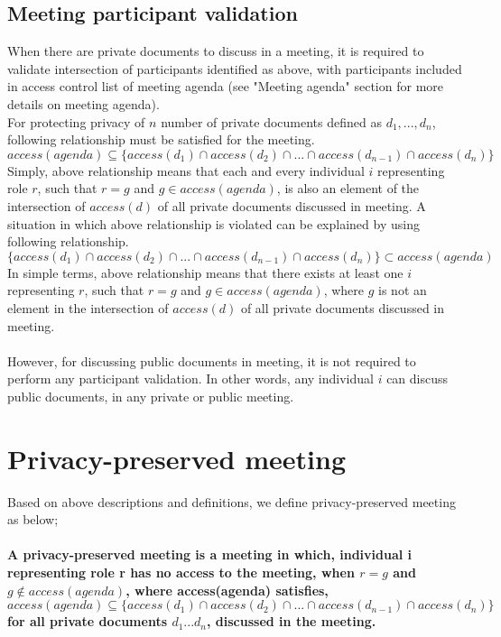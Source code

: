 \documentclass{article}
\begin{document}
\subsection{Meeting participant validation}
\noindent
When there are private documents to discuss in a meeting, it is required to validate intersection of participants identified as above, with participants included in access control list of meeting agenda (see "Meeting agenda" section for more details on meeting agenda).\\ 
For protecting privacy of $n$ number of private documents defined as $d_{1}, ... , d_{n}$, following relationship must be satisfied for the meeting. 
\[ access(agenda) \subseteq \{access(d_{1}) \cap access(d_{2}) \cap ... \cap access(d_{n-1}) \cap access(d_{n})\} \]
\noindent
Simply, above relationship means that each and every individual $i$ representing role $r$, such that $r = g$ and $g \in access(agenda)$, is also an element of the intersection of $access(d)$ of all private documents discussed in meeting.
A situation in which above relationship is violated can be explained by using following relationship. 
\[ \{access(d_{1}) \cap access(d_{2}) \cap ... \cap access(d_{n-1}) \cap access(d_{n})\} \subset access(agenda) \]
In simple terms, above relationship means that there exists at least one $i$ representing $r$, such that $r = g$ and $g \in access(agenda)$, where $g$ is not an element in the intersection of $access(d)$ of all private documents discussed in meeting.\\ \\
\noindent
However, for discussing public documents in meeting, it is not required to perform any participant validation. In other words, any individual $i$ can discuss public documents, in any private or public meeting.

\section{Privacy-preserved meeting}
Based on above descriptions and definitions, we define privacy-preserved meeting as below;\\ \\
\textbf{A privacy-preserved meeting is a meeting in which, individual i representing role r has no access to the meeting, when $r = g$ and $g \notin access(agenda)$, where access(agenda) satisfies,} 
\[access(agenda) \subseteq \{access(d_{1}) \cap access(d_{2}) \cap ... \cap access(d_{n-1}) \cap access(d_{n})\} \]
\textbf{for all private documents $d_{1} ... d_{n}$, discussed in the meeting.} 
\end{document}
